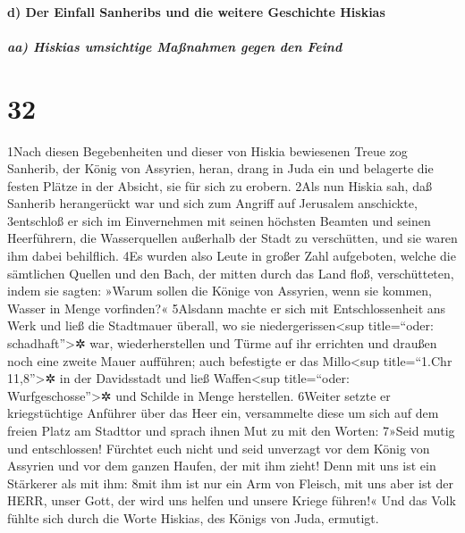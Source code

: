 \hypertarget{d-der-einfall-sanheribs-und-die-weitere-geschichte-hiskias}{%
\paragraph{d) Der Einfall Sanheribs und die weitere Geschichte
Hiskias}\label{d-der-einfall-sanheribs-und-die-weitere-geschichte-hiskias}}

\hypertarget{aa-hiskias-umsichtige-mauxdfnahmen-gegen-den-feind}{%
\subparagraph{aa) Hiskias umsichtige Maßnahmen gegen den
Feind}\label{aa-hiskias-umsichtige-mauxdfnahmen-gegen-den-feind}}

\hypertarget{section-31}{%
\section{32}\label{section-31}}

1Nach diesen Begebenheiten und dieser von Hiskia bewiesenen Treue zog
Sanherib, der König von Assyrien, heran, drang in Juda ein und belagerte
die festen Plätze in der Absicht, sie für sich zu erobern. 2Als nun
Hiskia sah, daß Sanherib herangerückt war und sich zum Angriff auf
Jerusalem anschickte, 3entschloß er sich im Einvernehmen mit seinen
höchsten Beamten und seinen Heerführern, die Wasserquellen außerhalb der
Stadt zu verschütten, und sie waren ihm dabei behilflich. 4Es wurden
also Leute in großer Zahl aufgeboten, welche die sämtlichen Quellen und
den Bach, der mitten durch das Land floß, verschütteten, indem sie
sagten: »Warum sollen die Könige von Assyrien, wenn sie kommen, Wasser
in Menge vorfinden?« 5Alsdann machte er sich mit Entschlossenheit ans
Werk und ließ die Stadtmauer überall, wo sie niedergerissen\textless sup
title=``oder: schadhaft''\textgreater✲ war, wiederherstellen und Türme
auf ihr errichten und draußen noch eine zweite Mauer aufführen; auch
befestigte er das Millo\textless sup title=``1.Chr 11,8''\textgreater✲
in der Davidsstadt und ließ Waffen\textless sup title=``oder:
Wurfgeschosse''\textgreater✲ und Schilde in Menge herstellen. 6Weiter
setzte er kriegstüchtige Anführer über das Heer ein, versammelte diese
um sich auf dem freien Platz am Stadttor und sprach ihnen Mut zu mit den
Worten: 7»Seid mutig und entschlossen! Fürchtet euch nicht und seid
unverzagt vor dem König von Assyrien und vor dem ganzen Haufen, der mit
ihm zieht! Denn mit uns ist ein Stärkerer als mit ihm: 8mit ihm ist nur
ein Arm von Fleisch, mit uns aber ist der HERR, unser Gott, der wird uns
helfen und unsere Kriege führen!« Und das Volk fühlte sich durch die
Worte Hiskias, des Königs von Juda, ermutigt.

